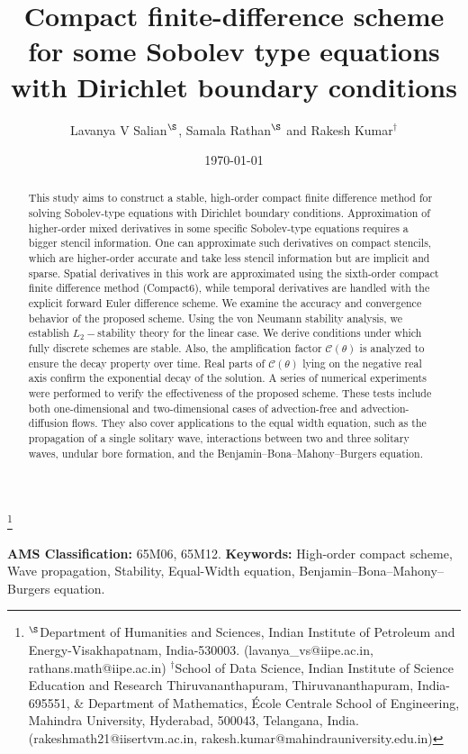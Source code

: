 \documentclass[11pt,a4paper]{amsart}
\theoremstyle{plain}
\theoremstyle{definition}
\theoremstyle{remark}
\numberwithin{equation}{section}
\begin{document}
\author{Lavanya V Salian$^{\S}$, Samala Rathan$^{\S}$ and Rakesh Kumar$^\dagger$}
\title{Compact finite-difference scheme for some Sobolev type equations with Dirichlet boundary conditions}
\thanks{
$^{\S}$Department of Humanities and Sciences, Indian Institute of Petroleum and Energy-Visakhapatnam,
India-530003. (lavanya\_vs@iipe.ac.in,\,rathans.math@iipe.ac.in)
\newline
$^\dagger$School of Data Science, 
Indian Institute of Science Education and Research
Thiruvananthapuram, 
Thiruvananthapuram, India-695551, \& Department of Mathematics, École Centrale School of Engineering, Mahindra University, Hyderabad, 500043, Telangana, India.(rakeshmath21@iisertvm.ac.in, rakesh.kumar@mahindrauniversity.edu.in)}
\date{\today}
 \maketitle
\begin{abstract}
This study aims to construct a stable, high-order compact finite difference method for solving Sobolev-type equations with Dirichlet boundary conditions. Approximation of higher-order mixed derivatives in some specific Sobolev-type equations requires a bigger stencil information.  One can approximate such derivatives on compact stencils, which are higher-order accurate and take less stencil information but are implicit and sparse. Spatial derivatives in this work are approximated using the sixth-order compact finite difference method (Compact6), while temporal derivatives are handled with the explicit forward Euler difference scheme. We examine the accuracy and convergence behavior of the proposed scheme.  Using the von Neumann stability analysis, we establish $L_2-$stability theory for the linear case. We derive conditions under which fully discrete schemes are stable. Also, the amplification factor $\mathcal{C}(\theta)$ is analyzed to ensure the decay property over time. Real parts of $\mathcal{C}(\theta)$ lying on the negative real axis confirm the exponential decay of the solution. A series of numerical experiments were performed to verify the effectiveness of the proposed scheme. These tests include both one-dimensional and two-dimensional cases of advection-free and advection-diffusion flows. They also cover applications to the equal width equation, such as the propagation of a single solitary wave, interactions between two and three solitary waves, undular bore formation, and the Benjamin–Bona–Mahony–Burgers equation.
\end{abstract}
\bigskip
\noindent 
\textbf{AMS Classification:} 65M06, 65M12.
\newline
\noindent
\textbf{Keywords:}  High-order compact scheme,  Wave propagation, Stability, Equal-Width equation, Benjamin–Bona–Mahony–Burgers equation.
\end{document}
